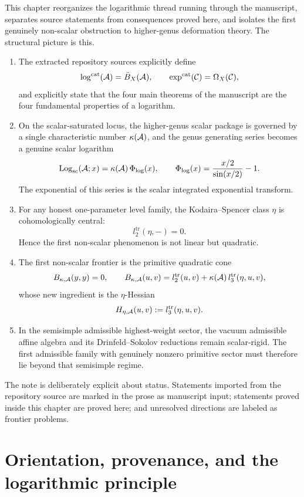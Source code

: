 \begin{summary}
This chapter reorganizes the logarithmic thread running through the manuscript,
separates source statements from consequences proved here, and isolates the
first genuinely non-scalar obstruction to higher-genus deformation theory.  The
structural picture is this.

\begin{enumerate}[label=\textup{(\roman*)}]
\item The extracted repository sources explicitly define
\[
\log^{\mathrm{cat}}(\mathcal{A})=\bar B_X(\mathcal{A}),
\qquad
\exp^{\mathrm{cat}}(\mathcal{C})=\Omega_X(\mathcal{C}),
\]
and explicitly state that the four main theorems of the manuscript are the four
fundamental properties of a logarithm.
\item On the scalar-saturated locus, the higher-genus scalar package is governed
by a single characteristic number $\kappa(\mathcal{A})$, and the genus generating
series becomes a genuine scalar logarithm
\[
\mathrm{Log}_{\mathrm{sc}}(\mathcal{A};x)=\kappa(\mathcal{A})\,\Phi_{\log}(x),
\qquad
\Phi_{\log}(x)=\frac{x/2}{\sin(x/2)}-1.
\]
The exponential of this series is the scalar integrated exponential transform.
\item For any honest one-parameter level family, the Kodaira--Spencer class
$\eta$ is cohomologically central:
\[
 l_2^{\mathrm{tr}}(\eta,-)=0.
\]
Hence the first non-scalar phenomenon is not linear but quadratic.
\item The first non-scalar frontier is the primitive quadratic cone
\[
B_{\kappa,\mathcal{A}}(y,y)=0,
\qquad
B_{\kappa,\mathcal{A}}(u,v)=l_2^{\mathrm{tr}}(u,v)+\kappa(\mathcal{A})\,l_3^{\mathrm{tr}}(\eta,u,v),
\]
whose new ingredient is the $\eta$-Hessian
\[
H_{\eta,\mathcal{A}}(u,v):=l_3^{\mathrm{tr}}(\eta,u,v).
\]
\item In the semisimple admissible highest-weight sector, the vacuum admissible
affine algebra and its Drinfeld--Sokolov reductions remain scalar-rigid.  The
first admissible family with genuinely nonzero primitive sector must therefore
lie beyond that semisimple regime.
\end{enumerate}

The note is deliberately explicit about status.  Statements imported from the
repository source are marked in the prose as manuscript input; statements proved
inside this chapter are proved here; and unresolved directions are labeled as
frontier problems.
\end{summary}

\section{Orientation, provenance, and the logarithmic principle}
\label{sec:orientation-provenance}


